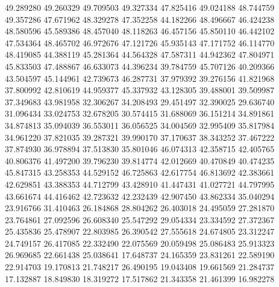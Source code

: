 49.289280
49.260329
49.709503
49.327334
47.825416
49.024188
48.744759
49.357286
47.671962
48.329278
47.352258
44.182266
48.496667
46.424238
48.580596
45.589386
48.457040
48.118263
46.457156
45.850110
46.442102
47.534364
48.465702
46.972676
47.121726
45.935143
47.171752
46.114770
48.419085
44.388119
45.281364
44.564328
47.587311
44.942362
47.804971
45.833503
47.488867
46.633073
44.396234
39.784759
45.707126
40.209366
43.504597
45.144961
42.739673
46.287731
37.979392
39.276156
41.821968
37.800992
42.810619
44.959377
45.337932
43.128305
39.488001
39.509987
37.349683
43.981958
32.306267
34.208493
29.451497
32.390025
29.636740
31.096434
33.024753
32.678205
30.574415
31.688069
36.151214
34.891861
34.874813
35.094039
36.553011
36.056525
34.004569
32.995409
35.817984
34.961220
37.821035
39.287321
39.990170
37.170637
38.343252
37.467222
37.874930
36.978894
37.513830
35.801046
46.074313
42.358715
42.405765
40.806376
41.497200
39.796230
39.814774
42.012669
40.470849
40.474235
45.847315
43.258353
44.529152
46.725863
42.617754
46.813692
42.383661
42.629851
43.388353
44.712799
43.428910
41.447431
41.027721
44.797995
43.661674
44.416462
42.723632
42.232439
42.907450
43.862334
35.040294
23.916766
31.410463
26.184868
28.804262
26.403018
24.495059
27.281870
23.764861
27.092596
26.608340
25.547292
29.054334
23.334592
27.372367
25.435836
25.478907
22.803985
26.390542
27.555618
24.674805
23.312247
24.749157
26.417085
22.332490
22.075569
20.059498
25.086483
25.913323
26.969685
22.661438
25.038641
17.648737
24.165359
23.831261
22.589190
22.914703
19.170813
21.748217
26.490195
19.043408
19.661569
21.284737
17.132887
18.849830
18.319272
17.517862
21.343358
21.461399
16.982278

